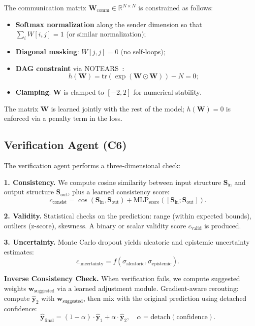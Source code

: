 The communication matrix $\mathbf{W}_{\text{comm}} \in \mathbb{R}^{N \times N}$ is constrained as follows:
\begin{itemize}[leftmargin=*]
    \item \textbf{Softmax normalization} along the sender dimension so that $\sum_i W[i,j] = 1$ (or similar normalization);
    \item \textbf{Diagonal masking}: $W[j,j] = 0$ (no self-loops);
    \item \textbf{DAG constraint} via NOTEARS~\cite{zheng2018dags}:
    \begin{equation}
    \label{eq:dag}
    h(\mathbf{W}) = \text{tr}(\exp(\mathbf{W} \odot \mathbf{W})) - N = 0;
    \end{equation}
    \item \textbf{Clamping}: $\mathbf{W}$ is clamped to $[-2, 2]$ for numerical stability.
\end{itemize}

The matrix $\mathbf{W}$ is learned jointly with the rest of the model; $h(\mathbf{W}) = 0$ is enforced via a penalty term in the loss.

\subsection{Verification Agent (C6)}
\label{sec:verification}

The verification agent performs a three-dimensional check:

\textbf{1. Consistency.} We compute cosine similarity between input structure $\mathbf{S}_{\text{in}}$ and output structure $\mathbf{S}_{\text{out}}$, plus a learned consistency score:
\begin{equation}
c_{\text{consist}} = \cos(\mathbf{S}_{\text{in}}, \mathbf{S}_{\text{out}}) + \text{MLP}_{\text{score}}([\mathbf{S}_{\text{in}}; \mathbf{S}_{\text{out}}]).
\end{equation}

\textbf{2. Validity.} Statistical checks on the prediction: range (within expected bounds), outliers (z-score), skewness. A binary or scalar validity score $c_{\text{valid}}$ is produced.

\textbf{3. Uncertainty.} Monte Carlo dropout yields aleatoric and epistemic uncertainty estimates:
\begin{equation}
c_{\text{uncertainty}} = f(\sigma_{\text{aleatoric}}, \sigma_{\text{epistemic}}).
\end{equation}

\textbf{Inverse Consistency Check.} When verification fails, we compute suggested weights $\mathbf{w}_{\text{suggested}}$ via a learned adjustment module. Gradient-aware rerouting: compute $\hat{\mathbf{y}}_2$ with $\mathbf{w}_{\text{suggested}}$, then mix with the original prediction using detached confidence:
\begin{equation}
\hat{\mathbf{y}}_{\text{final}} = (1 - \alpha) \cdot \hat{\mathbf{y}}_1 + \alpha \cdot \hat{\mathbf{y}}_2, \quad \alpha = \text{detach}(\text{confidence}).
\end{equation}

